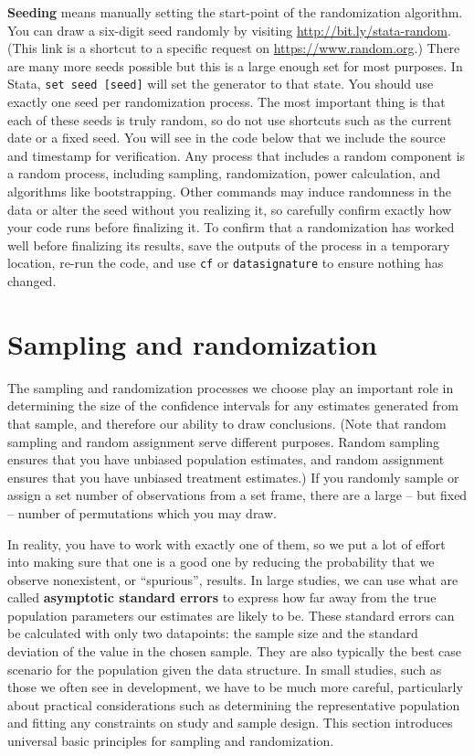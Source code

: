 \textbf{Seeding} means manually setting the start-point of the randomization algorithm.
You can draw a six-digit seed randomly by visiting \url{http://bit.ly/stata-random}.
(This link is a shortcut to a specific request on \url{https://www.random.org}.)
There are many more seeds possible but this is a large enough set for most purposes.
In Stata, \texttt{set seed [seed]} will set the generator to that state.
You should use exactly one seed per randomization process.
The most important thing is that each of these seeds is truly random,
so do not use shortcuts such as the current date or a fixed seed.
You will see in the code below that we include the source and timestamp for verification.
Any process that includes a random component is a random process,
including sampling, randomization, power calculation, and algorithms like bootstrapping.
Other commands may induce randomness in the data or alter the seed without you realizing it,
so carefully confirm exactly how your code runs before finalizing it.
To confirm that a randomization has worked well before finalizing its results,
save the outputs of the process in a temporary location,
re-run the code, and use \texttt{cf} or \texttt{datasignature} to ensure nothing has changed.


\section{Sampling and randomization}

The sampling and randomization processes we choose
play an important role in determining the size of the confidence intervals
for any estimates generated from that sample,
and therefore our ability to draw conclusions.
(Note that random sampling and random assignment serve different purposes.
Random sampling ensures that you have unbiased population estimates,
and random assignment ensures that you have unbiased treatment estimates.)
If you randomly sample or assign a set number of observations from a set frame,
there are a large -- but fixed -- number of permutations which you may draw.

In reality, you have to work with exactly one of them,
so we put a lot of effort into making sure that one is a good one
by reducing the probability that we observe nonexistent, or ``spurious'', results.
In large studies, we can use what are called \textbf{asymptotic standard errors}
to express how far away from the true population parameters our estimates are likely to be.
These standard errors can be calculated with only two datapoints:
the sample size and the standard deviation of the value in the chosen sample.
They are also typically the best case scenario for the population given the data structure.
In small studies, such as those we often see in development,
we have to be much more careful, particularly about practical considerations
such as determining the representative population
and fitting any constraints on study and sample design.
This section introduces universal basic principles for sampling and randomization.

